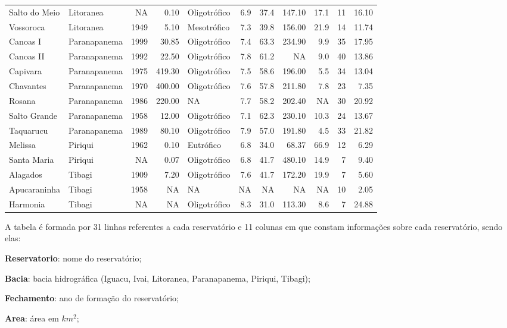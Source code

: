 \documentclass[
]{book}
\begin{document}
\begin{table}
\begin{tabular}{llrrlrrrrrr}
Salto do Meio & Litoranea & NA & 0.10 & Oligotrófico & 6.9 & 37.4 & 147.10 & 17.1 & 11 & 16.10\\
Vossoroca & Litoranea & 1949 & 5.10 & Mesotrófico & 7.3 & 39.8 & 156.00 & 21.9 & 14 & 11.74\\
Canoas I & Paranapanema & 1999 & 30.85 & Oligotrófico & 7.4 & 63.3 & 234.90 & 9.9 & 35 & 17.95\\
\addlinespace
Canoas II & Paranapanema & 1992 & 22.50 & Oligotrófico & 7.8 & 61.2 & NA & 9.0 & 40 & 13.86\\
Capivara & Paranapanema & 1975 & 419.30 & Oligotrófico & 7.5 & 58.6 & 196.00 & 5.5 & 34 & 13.04\\
Chavantes & Paranapanema & 1970 & 400.00 & Oligotrófico & 7.6 & 57.8 & 211.80 & 7.8 & 23 & 7.35\\
Rosana & Paranapanema & 1986 & 220.00 & NA & 7.7 & 58.2 & 202.40 & NA & 30 & 20.92\\
Salto Grande & Paranapanema & 1958 & 12.00 & Oligotrófico & 7.1 & 62.3 & 230.10 & 10.3 & 24 & 13.67\\
\addlinespace
Taquarucu & Paranapanema & 1989 & 80.10 & Oligotrófico & 7.9 & 57.0 & 191.80 & 4.5 & 33 & 21.82\\
Melissa & Piriqui & 1962 & 0.10 & Eutrófico & 6.8 & 34.0 & 68.37 & 66.9 & 12 & 6.29\\
Santa Maria & Piriqui & NA & 0.07 & Oligotrófico & 6.8 & 41.7 & 480.10 & 14.9 & 7 & 9.40\\
Alagados & Tibagi & 1909 & 7.20 & Oligotrófico & 7.6 & 41.7 & 172.20 & 19.9 & 7 & 5.60\\
Apucaraninha & Tibagi & 1958 & NA & NA & NA & NA & NA & NA & 10 & 2.05\\
\addlinespace
Harmonia & Tibagi & NA & NA & Oligotrófico & 8.3 & 31.0 & 113.30 & 8.6 & 7 & 24.88\\
\bottomrule
\end{tabular}
\endgroup{}
\end{table}

A tabela é formada por 31 linhas referentes a cada reservatório e 11 colunas em que constam informações sobre cada reservatório, sendo elas:

\textbf{Reservatorio}: nome do reservatório;

\textbf{Bacia}: bacia hidrográfica (Iguacu, Ivai, Litoranea, Paranapanema, Piriqui, Tibagi);

\textbf{Fechamento}: ano de formação do reservatório;

\textbf{Area}: área em \(km^2\);
\end{document}

